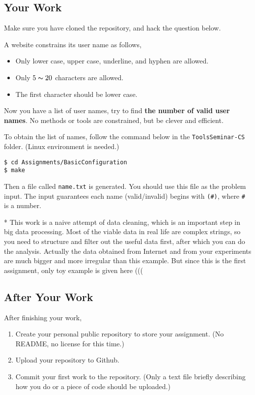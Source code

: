 \documentclass[english]{../TexTemplate/thesis}
\begin{document}
\subsection{Your Work}
Make sure you have cloned the repository, and hack the question below.

\bigskip
\begin{question}[Username]\normalfont
A website constrains its user name as follows,
\begin{itemize}
	\item Only lower case, upper case, underline, and hyphen are allowed.
	\item Only $5\thicksim 20$ characters are allowed.
	\item The first character should be lower case.
\end{itemize}
Now you have a list of user names, try to find \textbf{the number of valid user names}.
No methods or tools are constrained, but be clever and efficient.

To obtain the list of names, follow the command below in the \verb'ToolsSeminar-CS' folder.
(Linux environment is needed.)
\begin{lstlisting}
$ cd Assignments/BasicConfiguration
$ make
\end{lstlisting}
Then a file called \verb'name.txt' is generated.
You should use this file as the problem input.
The input guarantees each name (valid/invalid) begins with \verb'(#)', where \verb'#' is a number.
\end{question}

* This work is a naive attempt of data cleaning, which is an important step in big data processing.
Most of the viable data in real life are complex strings, so you need to structure and filter out the useful data first, after which you can do the analysis.
Actually the data obtained from Internet and from your experiments are much bigger and more irregular than this example.
But since this is the first assignment, only toy example is given here (((

\subsection{After Your Work}
After finishing your work,
\begin{enumerate}
\item Create your personal public repository to store your assignment.
(No README, no license for this time.)
\item Upload your repository to Github.
\item Commit your first work to the repository.
(Only a text file briefly describing how you do or a piece of code should be uploaded.)
\end{enumerate}
\end{document}
